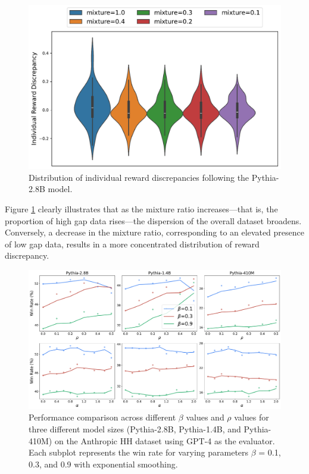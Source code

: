 \begin{figure}[t]
    \vspace{-10pt}
    \centering
    \includegraphics[width=0.6\linewidth]{figs/gap_mixture2.pdf}
    \caption{
        Distribution of individual reward discrepancies following the Pythia-2.8B model.
    }
    \label{fig_mix}
\end{figure}
Figure \ref{fig_mix} clearly illustrates that as the mixture ratio increases—that is, the proportion of high gap data rises—the dispersion of the overall dataset broadens. Conversely, a decrease in the mixture ratio, corresponding to an elevated presence of low gap data, results in a more concentrated distribution of reward discrepancy.

\begin{figure}[t]
    \vspace{-10pt}
    \centering
    \includegraphics[width=0.8\linewidth]{figs/params_beta_DPO.pdf}
    \caption{
        Performance comparison across different $\beta$ values and $\rho$ values for three different model sizes (Pythia-2.8B, Pythia-1.4B, and Pythia-410M) on the Anthropic HH dataset using GPT-4 as the evaluator. Each subplot represents the win rate for varying parameters $\beta$ = 0.1, 0.3, and 0.9 with exponential smoothing.
    }
    \label{fig_params}
    \vspace{-10pt}
\end{figure}

